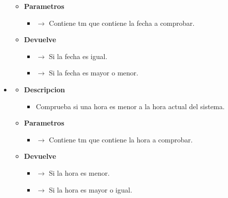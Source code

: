 \begin{itemize}
\begin{itemize}
\begin{itemize}
 		\end{itemize}
 		\item \textbf{Parametros}
 		\begin{itemize}
 			\item {} $\rightarrow$ Contiene tm que contiene la fecha a comprobar.
 		\end{itemize}
         \item \textbf{Devuelve}
 		\begin{itemize}
 			\item {} $\rightarrow$ Si la fecha es igual.
             \item {} $\rightarrow$ Si la fecha es mayor o menor.
 		\end{itemize}
 	\end{itemize}
    \item {}
     \begin{itemize}
         \item \textbf{Descripcion}
         \begin{itemize}
 			\item Comprueba si una hora es menor a la hora actual del sistema.
 		\end{itemize}
 		\item \textbf{Parametros}
 		\begin{itemize}
 			\item {} $\rightarrow$ Contiene tm que contiene la hora a comprobar.
 		\end{itemize}
         \item \textbf{Devuelve}
 		\begin{itemize}
 			\item {} $\rightarrow$ Si la hora es menor.
             \item {} $\rightarrow$ Si la hora es mayor o igual.
 		\end{itemize}
 	\end{itemize}
\end{itemize}
\newpage
